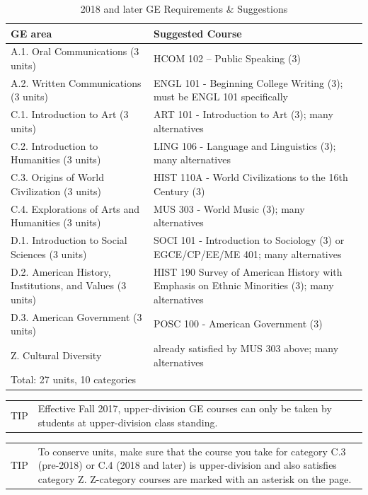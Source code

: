 \documentclass{book}
\newenvironment{tip}{
  \tcolorbox \begin{tabular}{m{.5in} m{5.25in}}
    \Large{TIP} &
}{
  \end{tabular} \endtcolorbox
}
\begin{document}
\begin{table}
\caption{2018 and later GE Requirements \& Suggestions}
\begin{center}
\begin{tabular}{| p{3in} | p{3in} |} \hline
  \textbf{GE area} & \textbf{Suggested Course} \\ \hline
  A.1. Oral Communications (3 units) & HCOM 102 – Public Speaking (3) \\ \hline
  A.2. Written Communications (3 units) & ENGL 101 - Beginning College Writing (3); must be ENGL 101 specifically \\ \hline
  C.1. Introduction to Art (3 units) & ART 101 - Introduction to Art (3); many alternatives \\ \hline
  C.2. Introduction to Humanities (3 units) & LING 106 - Language and Linguistics (3); many alternatives \\ \hline
  C.3. Origins of World Civilization (3 units) & HIST 110A - World Civilizations to the 16th Century (3) \\ \hline
  C.4. Explorations of Arts and Humanities (3 units) & MUS 303 - World Music (3); many alternatives \\ \hline
  D.1. Introduction to Social Sciences (3 units) & SOCI 101 - Introduction to Sociology (3) or EGCE/CP/EE/ME 401; many alternatives \\ \hline
  D.2. American History, Institutions, and Values (3 units) & HIST 190 Survey of American History with Emphasis on Ethnic Minorities (3); many alternatives \\ \hline
  D.3. American Government (3 units) & POSC 100 - American Government (3) \\ \hline
  Z. Cultural Diversity & already satisfied by MUS 303 above; many alternatives \\ \hline
  \multicolumn{2}{|l|}{Total: 27 units, 10 categories} \\ \hline
\end{tabular}
\end{center}
\end{table}

\begin{tip}
Effective Fall 2017, upper-division GE courses can only be taken by
students at upper-division class standing.
\end{tip}

\begin{tip}
To conserve units, make sure that the course you take for category C.3
(pre-2018) or C.4 (2018 and later) is upper-division and also
satisfies category Z. Z-category courses are marked with an asterisk
on the \gecourselist page.
\end{tip}
\end{document}
